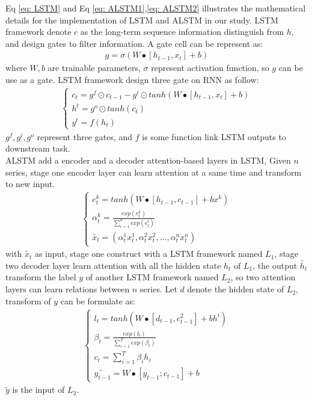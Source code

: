 \documentclass[10pt,letterpaper]{article}
\begin{document}
Eq \ref {eq: LSTM} and Eq \ref {eq: ALSTM1},\ref {eq: ALSTM2} illustrates the mathematical details for the implementation of LSTM and ALSTM in our study.
LSTM framework denote $c$ as the long-term sequence information distinguish from $h$, and design gates to filter information. A gate cell can be represent as:
\begin{eqnarray}
\label{eq: Gate}
    g = \sigma(W\bullet[h_{t - 1}, x_t] + b)
\end{eqnarray}
where $W, b$ are trainable parameters, $\sigma$ represent activation function, so $g$ can be use as a gate. LSTM framework design three gate on RNN as follow:
\begin{eqnarray}
\label{eq: LSTM}
    \begin {cases} c_t = g^f{\odot}c_{t - 1} - g^i{\odot}tanh(W\bullet[h_{t - 1}, x_t] + b)
    \\h^t = g^o{\odot}tanh(c_t)
    \\y^t = f(h_t)
    \end {cases}
\end{eqnarray}
$g^f, g^i, g^o$ represent three gates, and $f$ is some function link LSTM outputs to downstream task.
\\ALSTM add a encoder and a decoder attention-based layers in LSTM, Given $n$ series, stage one encoder layer can learn attention at a same time and transform to new input.
\begin{eqnarray}
\label{eq: ALSTM1}
    \begin {cases} e^k_t = tanh(W\bullet[h_{t - 1}, c_{t - 1}] + bx^k)
    \\{\alpha}^k_t = \frac{exp(e^k_t)}{\sum_{i=1}^n exp(e^i_t)}
    \\\widetilde{x_t} = ({\alpha^1_t}x^1_t, {\alpha^2_t}x^2_t,..., {\alpha^n_t}x^n_t)
    \end {cases}
\end{eqnarray}
with $\widetilde{x_t}$ as input, stage one construct with a LSTM framework named $L_1$, stage two decoder layer learn attention with all the hidden state $h_t$ of $L_1$,
the output $\widetilde{h_t}$ transform the label $y$ of another LSTM framework named $L_2$, so two attention layers can learn relations between $n$ series.
Let $d$ denote the hidden state of $L_2$, transform of $y$ can be formulate as:
\begin{eqnarray}
\label{eq: ALSTM2}
    \begin {cases} l_t = tanh(W\bullet[d_{t - 1}, c^2_{t - 1}] + bh^i)
    \\{\beta}_t = \frac{exp(l_t)}{\sum_{i=1}^T exp({\beta}_t)}
    \\c_t = \sum_{i=1}^T {\beta}_ih_i
    \\\widetilde{y_{t - 1}} = W\bullet[y_{t - 1}; c_{t - 1}] + b
    \end {cases}
\end{eqnarray}
$\tilde{y}$ is the input of $L_2$.
\end{document}

